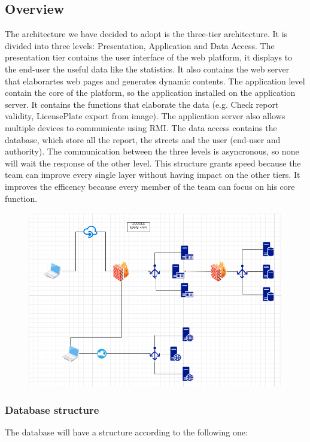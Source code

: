 \subsection{Overview}
The architecture we have decided to adopt is the three-tier architecture.
It is divided into three levels: Presentation, Application and Data Access.
The presentation tier contains the user interface of the web platform, it displays to the end-user the useful data like the statistics.
It also contains the web server that elaborartes web pages and generates dynamic contents.
The application level contain the core of the platform, so the application installed on the application server.
It contains the functions that elaborate the data (e.g. Check report validity, LicensePlate export from image).
The application server also allows multiple devices to communicate using RMI.
The data access contains the database, which store all the report, the streets and the user (end-user and authority).
The communication between the three levels is asyncronous, so none will wait the response of the other level.
This structure grants speed because the team can improve every single layer without having impact on the other tiers.
It improves the efficency because every member of the team can focus on his core function.
\begin{figure}
	\centering
	\includegraphics[width=0.98\linewidth, height=0.55\textheight]{Images/networkarchitecture}
	\caption[Network Architecture]{}
	\label{fig:networkarchitecture}
\end{figure}
\newpage
\subsubsection{Database structure}
The database will have a structure according to the following one: 

